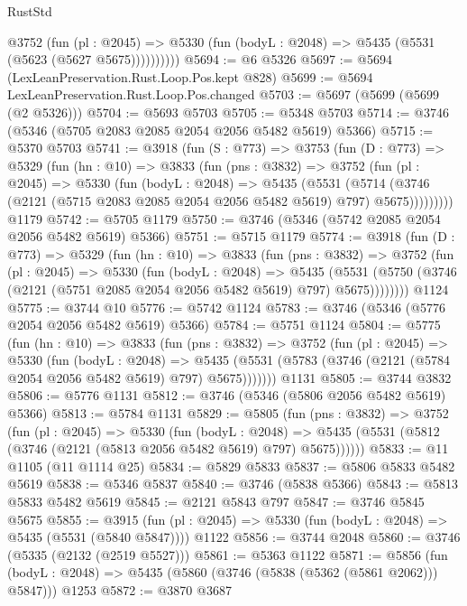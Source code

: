\begin{lexlean}{RustStd}
\begin{coremodule}
            @3752
              (fun (pl : @2045) =>
              @5330 (fun (bodyL : @2048) => @5435 (@5531 (@5623 (@5627 @5675))))))))))
@5694 := @6 @5326
@5697 := @5694 (LexLeanPreservation.Rust.Loop.Pos.kept @828)
@5699 := @5694 LexLeanPreservation.Rust.Loop.Pos.changed
@5703 := @5697 (@5699 (@5699 (@2 @5326)))
@5704 := @5693 @5703
@5705 := @5348 @5703
@5714 := @3746 (@5346 (@5705 @2083 @2085 @2054 @2056 @5482 @5619) @5366)
@5715 := @5370 @5703
@5741 := @3918
    (fun (S : @773) =>
    @3753
      (fun (D : @773) =>
      @5329
        (fun (hn : @10) =>
        @3833
          (fun (pns : @3832) =>
          @3752
            (fun (pl : @2045) =>
            @5330
              (fun (bodyL : @2048) =>
              @5435
                (@5531
                  (@5714
                    (@3746 (@2121 (@5715 @2083 @2085 @2054 @2056 @5482 @5619) @797) @5675)))))))))
    @1179
@5742 := @5705 @1179
@5750 := @3746 (@5346 (@5742 @2085 @2054 @2056 @5482 @5619) @5366)
@5751 := @5715 @1179
@5774 := @3918
    (fun (D : @773) =>
    @5329
      (fun (hn : @10) =>
      @3833
        (fun (pns : @3832) =>
        @3752
          (fun (pl : @2045) =>
          @5330
            (fun (bodyL : @2048) =>
            @5435
              (@5531 (@5750 (@3746 (@2121 (@5751 @2085 @2054 @2056 @5482 @5619) @797) @5675))))))))
    @1124
@5775 := @3744 @10
@5776 := @5742 @1124
@5783 := @3746 (@5346 (@5776 @2054 @2056 @5482 @5619) @5366)
@5784 := @5751 @1124
@5804 := @5775
    (fun (hn : @10) =>
    @3833
      (fun (pns : @3832) =>
      @3752
        (fun (pl : @2045) =>
        @5330
          (fun (bodyL : @2048) =>
          @5435 (@5531 (@5783 (@3746 (@2121 (@5784 @2054 @2056 @5482 @5619) @797) @5675)))))))
    @1131
@5805 := @3744 @3832
@5806 := @5776 @1131
@5812 := @3746 (@5346 (@5806 @2056 @5482 @5619) @5366)
@5813 := @5784 @1131
@5829 := @5805
    (fun (pns : @3832) =>
    @3752
      (fun (pl : @2045) =>
      @5330
        (fun (bodyL : @2048) =>
        @5435 (@5531 (@5812 (@3746 (@2121 (@5813 @2056 @5482 @5619) @797) @5675))))))
@5833 := @11 @1105 (@11 @1114 @25)
@5834 := @5829 @5833
@5837 := @5806 @5833 @5482 @5619
@5838 := @5346 @5837
@5840 := @3746 (@5838 @5366)
@5843 := @5813 @5833 @5482 @5619
@5845 := @2121 @5843 @797
@5847 := @3746 @5845 @5675
@5855 := @3915
    (fun (pl : @2045) => @5330 (fun (bodyL : @2048) => @5435 (@5531 (@5840 @5847))))
    @1122
@5856 := @3744 @2048
@5860 := @3746 (@5335 (@2132 (@2519 @5527)))
@5861 := @5363 @1122
@5871 := @5856
    (fun (bodyL : @2048) => @5435 (@5860 (@3746 (@5838 (@5362 (@5861 @2062))) @5847)))
    @1253
@5872 := @3870 @3687

\end{coremodule}
\end{lexlean}
